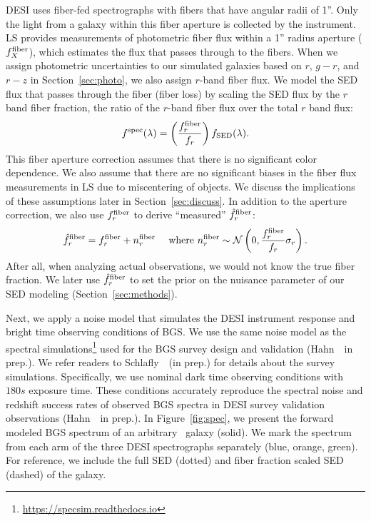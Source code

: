 DESI uses fiber-fed spectrographs with fibers that have angular radii of 1''. 
Only the light from a galaxy within this fiber aperture is collected by the 
instrument.
LS provides measurements of photometric fiber flux within a 1'' radius aperture
($f_X^{\rm fiber}$), which estimates the flux that passes through to the fibers.
When we assign photometric uncertainties to our simulated galaxies based on
$r$, $g-r$, and $r-z$ in Section~\ref{sec:photo}, we also assign $r$-band fiber
flux. 
We model the SED flux that passes through the fiber (fiber loss) by scaling the 
SED flux by the $r$ band fiber fraction, the ratio of the $r$-band fiber flux 
over the total $r$ band flux: 
\begin{equation}
    f^{\rm spec}(\lambda) = \left(\frac{f_r^{\rm fiber}}{f_r}\right)f_{\rm SED}(\lambda).
\end{equation}
This fiber aperture correction assumes that there is no significant color
dependence. 
We also assume that there are no significant biases in the fiber flux
measurements in LS due to miscentering of objects. 
We discuss the implications of these assumptions later in
Section~\ref{sec:discuss}. 
In addition to the aperture correction, we also use $f_r^{\rm fiber}$ to derive
``measured'' $\hat{f}_r^{\rm fiber}$: 
\begin{equation}
    \hat{f}_r^{\rm fiber} = f_r^{\rm fiber} + n^{\rm fiber}_r \quad~{\rm
    where}~n^{\rm fiber}_r \sim \mathcal{N}\left(0, \frac{f_r^{\rm fiber}}{f_r}
    \sigma_r\right).
\end{equation}
After all, when analyzing actual observations, we would not know the true fiber
fraction. 
We later use $\hat{f}_r^{\rm fiber}$ to set the prior on the nuisance parameter
of our SED modeling (Section~\ref{sec:methods}).

Next, we apply a noise model that simulates the DESI instrument response and
bright time observing conditions of BGS. 
We use the same noise model as the spectral 
simulations\footnote{\href{https://specsim.readthedocs.io/en/stable/guide.html}{https://specsim.readthedocs.io}} 
used for the BGS survey design and validation (Hahn~\etal~in prep.). 
We refer readers to Schlafly~\etal~(in prep.) for details about the survey
simulations. 
Specifically, we use nominal dark time observing conditions with $180s$
exposure time. 
These conditions accurately reproduce the spectral noise and redshift success
rates of observed BGS spectra in DESI survey validation observations 
(Hahn~\etal~in prep.).
In Figure~\ref{fig:spec}, we present the forward modeled BGS spectrum of an
arbitrary \lgal~galaxy (solid). 
We mark the spectrum from each arm of the three DESI spectrographs separately 
(blue, orange, green).
For reference, we include the full SED (dotted) and fiber fraction scaled SED
(dashed) of the galaxy. 



